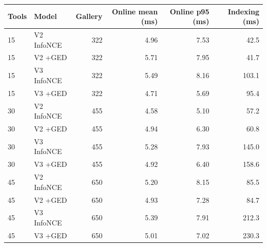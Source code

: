 \begin{tabular}{llrrrr}
\toprule
Tools & Model & Gallery & Online mean (ms) & Online p95 (ms) & Indexing (ms) \\
\midrule
15 & V2 InfoNCE & 322 & 4.96 & 7.53 & 42.5 \\
15 & V2 +GED & 322 & 5.71 & 7.95 & 41.7 \\
15 & V3 InfoNCE & 322 & 5.49 & 8.16 & 103.1 \\
15 & V3 +GED & 322 & 4.71 & 5.69 & 95.4 \\
30 & V2 InfoNCE & 455 & 4.58 & 5.10 & 57.2 \\
30 & V2 +GED & 455 & 4.94 & 6.30 & 60.8 \\
30 & V3 InfoNCE & 455 & 5.28 & 7.93 & 145.0 \\
30 & V3 +GED & 455 & 4.92 & 6.40 & 158.6 \\
45 & V2 InfoNCE & 650 & 5.20 & 8.15 & 85.5 \\
45 & V2 +GED & 650 & 4.93 & 7.28 & 84.7 \\
45 & V3 InfoNCE & 650 & 5.39 & 7.91 & 212.3 \\
45 & V3 +GED & 650 & 5.01 & 7.02 & 230.3 \\
\bottomrule
\end{tabular}
